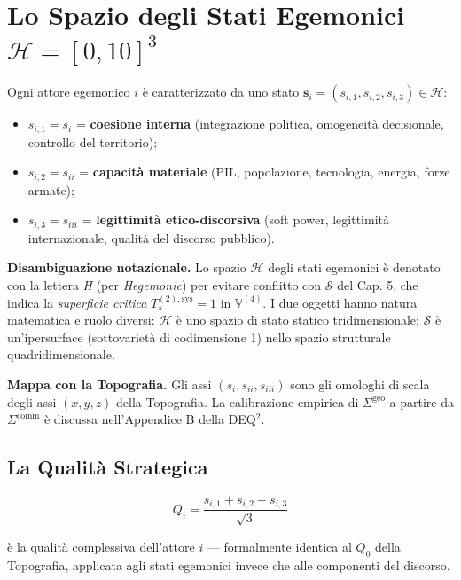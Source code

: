 \section{\texorpdfstring{Lo Spazio degli Stati Egemonici
\(\mathcal{H} = [0, 10]^3\)}{Lo Spazio degli Stati Egemonici \textbackslash mathcal\{H\} = {[}0, 10{]}\^{}3}}\label{lo-spazio-degli-stati-egemonici-mathcalh-0-103}

Ogni attore egemonico \(i\) è caratterizzato da uno stato
\(\mathbf{s}_i = (s_{i,1}, s_{i,2}, s_{i,3}) \in \mathcal{H}\):

\begin{itemize}
\tightlist
\item
  \(s_{i,1} = s_i\) = \textbf{coesione interna} (integrazione politica,
  omogeneità decisionale, controllo del territorio);
\item
  \(s_{i,2} = s_{ii}\) = \textbf{capacità materiale} (PIL, popolazione,
  tecnologia, energia, forze armate);
\item
  \(s_{i,3} = s_{iii}\) = \textbf{legittimità etico-discorsiva} (soft
  power, legittimità internazionale, qualità del discorso pubblico).
\end{itemize}

\Hypoth{} \textbf{Disambiguazione notazionale.} Lo spazio
\(\mathcal{H}\) degli stati egemonici è denotato con la lettera \emph{H}
(per \emph{Hegemonic}) per evitare conflitto con \(\mathcal{S}\) del
Cap. 5, che indica la \emph{superficie critica}
\(T_s^{(2),\text{sys}} = 1\) in \(\mathbb{V}^{(4)}\). I due oggetti
hanno natura matematica e ruolo diversi: \(\mathcal{H}\) è uno spazio di
stato statico tridimensionale; \(\mathcal{S}\) è un'ipersurface
(sottovarietà di codimensione 1) nello spazio strutturale
quadridimensionale.

\Hypoth{} \textbf{Mappa con la Topografia.} Gli assi
\((s_i, s_{ii}, s_{iii})\) sono gli omologhi di scala degli assi
\((x, y, z)\) della Topografia. La calibrazione empirica di
\(\Sigma^{\text{geo}}\) a partire da \(\Sigma^{\text{comm}}\) è discussa
nell'Appendice B della DEQ$^2$.

\subsection{La Qualità Strategica}\label{la-qualituxe0-strategica}

\[
Q_i = \frac{s_{i,1} + s_{i,2} + s_{i,3}}{\sqrt{3}}
\]

è la qualità complessiva dell'attore \(i\) --- formalmente identica al
\(Q_0\) della Topografia, applicata agli stati egemonici invece che alle
componenti del discorso.



